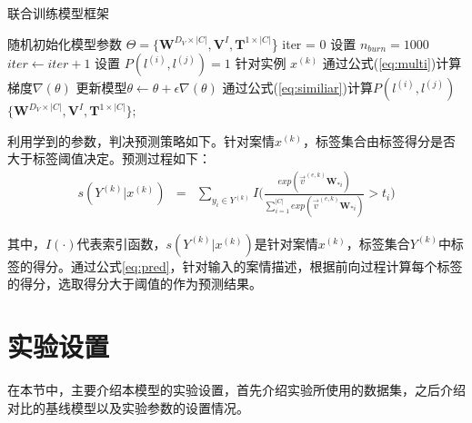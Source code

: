 \begin{algorithm}[htbp]
\caption{联合训练模型框架}
\label{alg:algo}
\begin{algorithmic}[1]
\State 随机初始化模型参数 $\Theta=\{\textbf{W}^{D_V\times |C|},\textbf{V}^I,\textbf{T}^{1\times|C|}$\}
\label{code:fram:initialize parameters}
\State iter = 0
\label{code:fram:begin}
\State 设置 $n_{burn} = 1000$
\label{code:fram:setvalue}
\Repeat
\label{code:fram:repeat}
\State $iter \leftarrow iter+1$
\label{code:fram:re_value}
\label{code:fram:if1}
\State 设置 $P(l^{(i)},l^{(j)}) = 1$
\label{code:fram:init1}
\label{code:fram:for1}
\State 针对实例 $x^{(k)}$
\label{code:fram:task_join1}
\State 通过公式(\ref{eq:multi})计算梯度$\nabla(\theta)$ 
\label{code:fram:com_grad}
\State 更新模型$\theta \leftarrow \theta + \epsilon \nabla(\theta)$
\label{code:fram:update_grad}
\EndFor
\Else
\label{code:fram:else1}
\State 通过公式(\ref{eq:similiar})计算$P(l^{(i)},l^{(j)})$
\label{code:fram:com_Sim}
\EndIf
{}
\State
\Return $\{\textbf{W}^{D_V\times |C|},\textbf{V}^I,\textbf{T}^{1\times|C|}\}$;
\end{algorithmic}
\end{algorithm}

利用学到的参数，判决预测策略如下。针对案情$x^{(k)}$，标签集合由标签得分是否大于标签阈值决定。预测过程如下：
\begin{eqnarray}\label{eq:pred}
s(Y^{(k)}|x^{(k)}) &=& \sum_{y_i\in Y^{(k)}}I\Big(\frac{exp(\vec{v}^{(e,k)}\textbf{W}_{*i})}{\sum_{i=1}^{|C|}exp(\vec{v}^{(e,k)}\textbf{W}_{*i})}>t_i\Big)
\label{eq:prediction}
\end{eqnarray}

其中，$I(\cdot)$代表索引函数，$s(Y^{(k)}|x^{(k)})$是针对案情$x^{(k)}$，标签集合$Y^{(k)}$中标签的得分。通过公式\ref{eq:pred}，针对输入的案情描述，根据前向过程计算每个标签的得分，选取得分大于阈值的作为预测结果。

\section{实验设置}
\label{sec:dpam_exper}

在本节中，主要介绍本模型的实验设置，首先介绍实验所使用的数据集，之后介绍对比的基线模型以及实验参数的设置情况。

